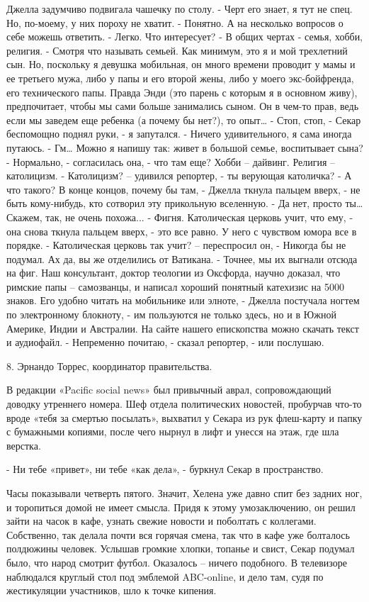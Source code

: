 Джелла задумчиво подвигала чашечку по столу.
- Черт его знает, я тут не спец. Но, по-моему, у них пороху не хватит.
- Понятно. А на несколько вопросов о себе можешь ответить.
- Легко. Что интересует?
- В общих чертах - семья, хобби, религия.
- Смотря что называть семьей. Как минимум, это я и мой трехлетний сын. Но, поскольку я девушка мобильная, он много времени проводит у мамы и ее третьего мужа, либо у папы и его второй жены, либо у моего экс-бойфренда, его технического папы. Правда Энди (это парень с которым я в основном живу), предпочитает, чтобы мы сами больше занимались сыном. Он в чем-то прав, ведь если мы заведем еще ребенка (а почему бы нет?), то опыт…
- Стоп, стоп, - Секар беспомощно поднял руки, - я запутался.
- Ничего удивительного, я сама иногда путаюсь.
- Гм… Можно я напишу так: живет в большой семье, воспитывает сына?
- Нормально, - согласилась она, - что там еще? Хобби – дайвинг. Религия – католицизм.
- Католицизм? – удивился репортер, - ты верующая католичка?
- А что такого? В конце концов, почему бы там, - Джелла ткнула пальцем вверх, - не быть кому-нибудь, кто сотворил эту прикольную вселенную.
- Да нет, просто ты… Скажем, так, не очень похожа...
- Фигня. Католическая церковь учит, что ему, - она снова ткнула пальцем вверх, - это все равно. У него с чувством юмора все в порядке.
- Католическая церковь так учит? – переспросил он, - Никогда бы не подумал. Ах да, вы же отделились от Ватикана.
- Точнее, мы их выгнали отсюда на фиг. Наш консультант, доктор теологии из Оксфорда, научно доказал, что римские папы – самозванцы, и написал хороший понятный катехизис на 5000 знаков. Его удобно читать на мобильнике или элноте, - Джелла постучала ногтем по электронному блокноту, - им пользуются не только здесь, но и в Южной Америке, Индии и Австралии. На сайте нашего епископства можно скачать текст и аудиофайл.
- Непременно почитаю, - сказал репортер, - или послушаю.



8. Эрнандо Торрес, координатор правительства.


В редакции «Pacific social news» был привычный аврал, сопровождающий доводку утреннего номера. Шеф отдела политических новостей, пробурчав что-то вроде «тебя за смертью посылать», выхватил у Секара из рук флеш-карту и папку с бумажными копиями, после чего нырнул в лифт и унесся на этаж, где шла верстка.

- Ни тебе «привет», ни тебе «как дела», - буркнул Секар в пространство.

Часы показывали четверть пятого. Значит, Хелена уже давно спит без задних ног, и торопиться домой не имеет смысла. Придя к этому умозаключению, он решил зайти на часок в кафе, узнать свежие новости и поболтать с коллегами. Собственно, так делала почти вся горячая смена, так что в кафе уже болталось полдюжины человек. Услышав громкие хлопки, топанье и свист, Секар подумал было, что народ смотрит футбол. Оказалось – ничего подобного. В телевизоре наблюдался круглый стол под эмблемой ABC-online, и дело там, судя по жестикуляции участников, шло к точке кипения.


